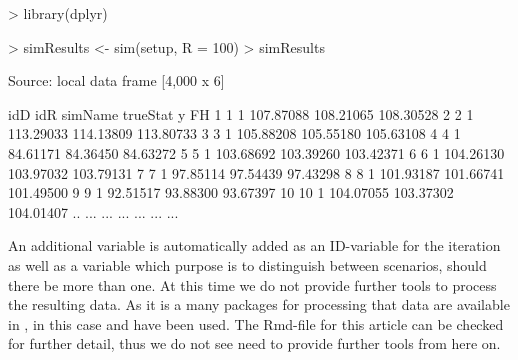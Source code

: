\documentclass[article]{ajs}
\begin{document}
\begin{Schunk}
\begin{Sinput}
> library(dplyr)
\end{Sinput}
\end{Schunk}
\begin{Schunk}
\begin{Sinput}
> simResults <- sim(setup, R = 100) %
> simResults %
\end{Sinput}
\begin{Soutput}
Source: local data frame [4,000 x 6]

   idD idR simName  trueStat         y        FH
1    1   1         107.87088 108.21065 108.30528
2    2   1         113.29033 114.13809 113.80733
3    3   1         105.88208 105.55180 105.63108
4    4   1          84.61171  84.36450  84.63272
5    5   1         103.68692 103.39260 103.42371
6    6   1         104.26130 103.97032 103.79131
7    7   1          97.85114  97.54439  97.43298
8    8   1         101.93187 101.66741 101.49500
9    9   1          92.51517  93.88300  93.67397
10  10   1         104.07055 103.37302 104.01407
.. ... ...     ...       ...       ...       ...
\end{Soutput}
\end{Schunk}

An additional variable  is automatically added as an ID-variable for the iteration as well as a variable  which purpose is to distinguish between scenarios, should there be more than one. At this time we do not provide further tools to process the resulting data. As it is a  many packages for processing that data are available in , in this case  \citep{wickham14} and  \citep{wickham07} have been used. The Rmd-file for this article can be checked for further detail, thus we do not see need to provide further tools from here on.

%
%
\end{document}
